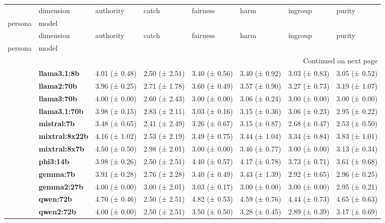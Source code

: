 \begin{longtable}{llllllll}
\toprule
 & dimension & authority & catch & fairness & harm & ingroup & purity \\
persona & model &  &  &  &  &  &  \\
\midrule
\endfirsthead
\toprule
 & dimension & authority & catch & fairness & harm & ingroup & purity \\
persona & model &  &  &  &  &  &  \\
\midrule
\endhead
\midrule
\multicolumn{8}{r}{Continued on next page} \\
\midrule
\endfoot
\bottomrule
\endlastfoot
\multirow[t]{12}{*}{\textbf{conservative}} & \textbf{llama3.1:8b} & 4.01 (± 0.48) & 2.50 (± 2.51) & 3.40 (± 0.56) & 3.40 (± 0.92) & 3.03 (± 0.83) & 3.05 (± 0.52) \\
\textbf{} & \textbf{llama2:70b} & 3.96 (± 0.25) & 2.71 (± 1.78) & 3.60 (± 0.49) & 3.57 (± 0.90) & 3.27 (± 0.73) & 3.19 (± 1.07) \\
\textbf{} & \textbf{llama3:70b} & 4.00 (± 0.00) & 2.60 (± 2.43) & 3.00 (± 0.00) & 3.06 (± 0.24) & 3.00 (± 0.00) & 3.00 (± 0.00) \\
\textbf{} & \textbf{llama3.1:70b} & 3.98 (± 0.15) & 2.83 (± 2.11) & 3.03 (± 0.16) & 3.15 (± 0.36) & 3.06 (± 0.23) & 2.95 (± 0.22) \\
\textbf{} & \textbf{mistral:7b} & 3.48 (± 0.65) & 2.41 (± 2.49) & 3.26 (± 0.67) & 3.15 (± 0.87) & 2.68 (± 0.47) & 2.53 (± 0.50) \\
\textbf{} & \textbf{mixtral:8x22b} & 4.16 (± 1.02) & 2.53 (± 2.19) & 3.49 (± 0.75) & 3.44 (± 1.04) & 3.34 (± 0.84) & 3.83 (± 1.01) \\
\textbf{} & \textbf{mixtral:8x7b} & 4.50 (± 0.50) & 2.98 (± 2.01) & 3.00 (± 0.00) & 3.46 (± 0.77) & 3.00 (± 0.00) & 3.13 (± 0.34) \\
\textbf{} & \textbf{phi3:14b} & 3.98 (± 0.26) & 2.50 (± 2.51) & 4.40 (± 0.57) & 4.17 (± 0.78) & 3.73 (± 0.71) & 3.61 (± 0.68) \\
\textbf{} & \textbf{gemma:7b} & 3.91 (± 0.28) & 2.76 (± 2.28) & 3.40 (± 0.49) & 3.43 (± 1.39) & 2.92 (± 0.65) & 2.96 (± 0.25) \\
\textbf{} & \textbf{gemma2:27b} & 4.00 (± 0.00) & 3.00 (± 2.01) & 3.03 (± 0.17) & 3.00 (± 0.00) & 3.00 (± 0.00) & 2.95 (± 0.21) \\
\textbf{} & \textbf{qwen:72b} & 4.70 (± 0.46) & 2.50 (± 2.51) & 4.82 (± 0.53) & 4.59 (± 0.76) & 4.44 (± 0.73) & 4.65 (± 0.63) \\
\textbf{} & \textbf{qwen2:72b} & 4.00 (± 0.00) & 2.50 (± 2.51) & 3.50 (± 0.50) & 3.28 (± 0.45) & 2.89 (± 0.39) & 3.17 (± 0.69) \\

\end{longtable}
